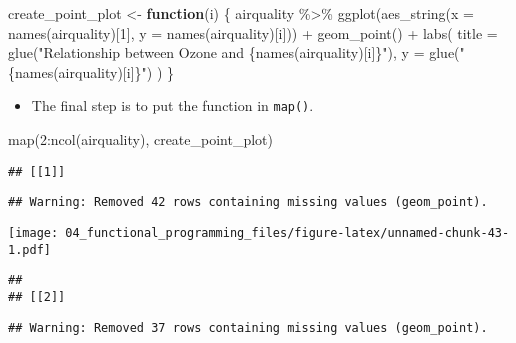 \documentclass[
]{book}
\newenvironment{Shaded}{\begin{snugshade}}{\end{snugshade}}
\newcommand{\AttributeTok}[1]{\textcolor[rgb]{0.77,0.63,0.00}{#1}}
\newcommand{\ControlFlowTok}[1]{\textcolor[rgb]{0.13,0.29,0.53}{\textbf{#1}}}
\newcommand{\DecValTok}[1]{\textcolor[rgb]{0.00,0.00,0.81}{#1}}
\newcommand{\FunctionTok}[1]{\textcolor[rgb]{0.00,0.00,0.00}{#1}}
\newcommand{\NormalTok}[1]{#1}
\newcommand{\OtherTok}[1]{\textcolor[rgb]{0.56,0.35,0.01}{#1}}
\newcommand{\SpecialCharTok}[1]{\textcolor[rgb]{0.00,0.00,0.00}{#1}}
\newcommand{\StringTok}[1]{\textcolor[rgb]{0.31,0.60,0.02}{#1}}
\providecommand{\tightlist}{%
  \setlength{\itemsep}{0pt}\setlength{\parskip}{0pt}}
\begin{document}
\begin{Shaded}
\begin{Highlighting}[]
\NormalTok{create\_point\_plot }\OtherTok{\textless{}{-}} \ControlFlowTok{function}\NormalTok{(i) \{}
\NormalTok{  airquality }\SpecialCharTok{\%\textgreater{}\%}
    \FunctionTok{ggplot}\NormalTok{(}\FunctionTok{aes\_string}\NormalTok{(}\AttributeTok{x =} \FunctionTok{names}\NormalTok{(airquality)[}\DecValTok{1}\NormalTok{], }\AttributeTok{y =} \FunctionTok{names}\NormalTok{(airquality)[i])) }\SpecialCharTok{+}
    \FunctionTok{geom\_point}\NormalTok{() }\SpecialCharTok{+}
    \FunctionTok{labs}\NormalTok{(}
      \AttributeTok{title =} \FunctionTok{glue}\NormalTok{(}\StringTok{"Relationship between Ozone and \{names(airquality)[i]\}"}\NormalTok{),}
      \AttributeTok{y =} \FunctionTok{glue}\NormalTok{(}\StringTok{"\{names(airquality)[i]\}"}\NormalTok{)}
\NormalTok{    )}
\NormalTok{\}}
\end{Highlighting}
\end{Shaded}

\begin{itemize}
\tightlist
\item
  The final step is to put the function in \texttt{map()}.
\end{itemize}

\begin{Shaded}
\begin{Highlighting}[]
\FunctionTok{map}\NormalTok{(}\DecValTok{2}\SpecialCharTok{:}\FunctionTok{ncol}\NormalTok{(airquality), create\_point\_plot)}
\end{Highlighting}
\end{Shaded}

\begin{verbatim}
## [[1]]
\end{verbatim}

\begin{verbatim}
## Warning: Removed 42 rows containing missing values (geom_point).
\end{verbatim}

\texttt{[image: 04\_functional\_programming\_files/figure-latex/unnamed-chunk-43-1.pdf]}

\begin{verbatim}
## 
## [[2]]
\end{verbatim}

\begin{verbatim}
## Warning: Removed 37 rows containing missing values (geom_point).
\end{verbatim}
\end{document}
